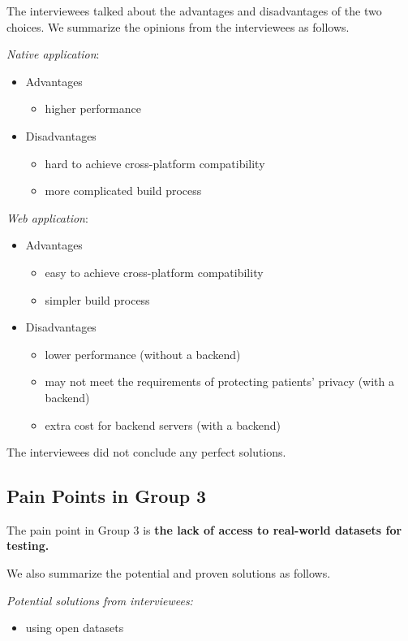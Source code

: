 The interviewees talked about the advantages and disadvantages of the two choices. We summarize the opinions from the interviewees as follows.

\textit{Native application}:
\begin{itemize}
\item Advantages
    \begin{itemize}
    \item higher performance
    \end{itemize}
\item Disadvantages
    \begin{itemize}
    \item hard to achieve cross-platform compatibility
    \item more complicated build process
    \end{itemize}
\end{itemize}
\textit{Web application}:
\begin{itemize}
\item Advantages
    \begin{itemize}
    \item easy to achieve cross-platform compatibility
    \item simpler build process
    \end{itemize}
\item Disadvantages
    \begin{itemize}
    \item lower performance (without a backend)    \item may not meet the requirements of protecting patients' privacy (with a backend)
    \item extra cost for backend servers (with a backend)
    \end{itemize}
\end{itemize}

The interviewees did not conclude any perfect solutions.

\subsection{Pain Points in Group 3}
\label{sec_pain_points_3}
The pain point in Group 3 is
\textbf{the lack of access to real-world datasets for testing.}

We also summarize the potential and proven solutions as follows.

\textit{Potential solutions from interviewees:}
\begin{itemize}
\item using open datasets
\end{itemize}

